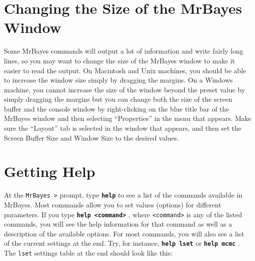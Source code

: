 \documentclass[12pt]{book}
\newcommand{\ttt}[1]{\texttt{#1} }
\newcommand{\tb}[1]{\texttt{\textbf{#1}} }
\begin{document}
\section{Changing the Size of the MrBayes Window}

Some MrBayes commands will output a lot of information and write fairly long lines, so
you may want to change the size of the MrBayes window to make it easier to read the
output. On Macintosh and Unix machines, you should be able to increase the window
size simply by dragging the margins. On a Windows machine, you cannot increase the
size of the window beyond the preset value by simply dragging the margins but you can
change both the size of the screen buffer and the
console window by right-clicking on the blue title bar of the MrBayes window and then
selecting ``Properties'' in the menu that appears. Make sure the ``Layout'' tab is selected in
the window that appears, and then set the Screen Buffer Size and Window Size to the
desired values.

\section{Getting Help}
\label{gettingHelp}

At the \ttt{MrBayes >} prompt, type \tb{help} to see a list of the commands available in
MrBayes. Most commands allow you to set values (options) for different parameters. If
you type \tb{help <command>}, where \ttt{<command>} is any of the listed commands, you
will see the help information for that command as well as a description of the available
options. For most commands, you will also see a list of the current settings at the end.
Try, for instance, \tb{help lset} or \tb{help mcmc}. The \ttt{lset} settings table at the end
should look like this:
\end{document}
